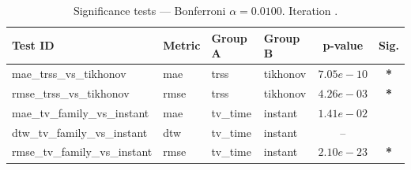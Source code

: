 ﻿%
\begin{table}[ht]
\centering
\caption[EEG reconstruction - Iteration it05b]{Significance tests — Bonferroni $\alpha=0.0100$. Iteration .}
\label{tab:sig_it05b_synthetic_three}
\small
\begin{tabular}{llllcc}
\toprule
Test ID & Metric & Group A & Group B & p-value & Sig. \\
\midrule
mae\_trss\_vs\_tikhonov & mae & trss & tikhonov & $7.05e-10$ & \textbf{*} \\
rmse\_trss\_vs\_tikhonov & rmse & trss & tikhonov & $4.26e-03$ & \textbf{*} \\
mae\_tv\_family\_vs\_instant & mae & tv\_time & instant & $1.41e-02$ &  \\
dtw\_tv\_family\_vs\_instant & dtw & tv\_time & instant & -- &  \\
rmse\_tv\_family\_vs\_instant & rmse & tv\_time & instant & $2.10e-23$ & \textbf{*} \\
\bottomrule
\end{tabular}
\end{table}







